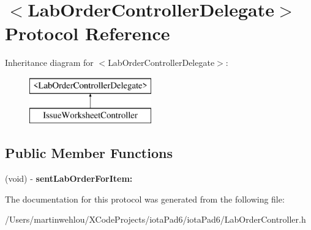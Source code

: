 \hypertarget{protocol_lab_order_controller_delegate-p}{
\section{$<$LabOrderControllerDelegate$>$ Protocol Reference}
\label{protocol_lab_order_controller_delegate-p}
}
Inheritance diagram for $<$LabOrderControllerDelegate$>$:\begin{figure}[H]
\begin{center}
\leavevmode
\includegraphics[height=2.000000cm]{protocol_lab_order_controller_delegate-p}
\end{center}
\end{figure}
\subsection*{Public Member Functions}
\begin{DoxyCompactItemize}
\item 
\hypertarget{protocol_lab_order_controller_delegate-p_ab8957ae93cbd3cf1f94b18056e327708}{
(void) -\/ {\bfseries sentLabOrderForItem:}}
\label{protocol_lab_order_controller_delegate-p_ab8957ae93cbd3cf1f94b18056e327708}

\end{DoxyCompactItemize}


The documentation for this protocol was generated from the following file:\begin{DoxyCompactItemize}
\item 
/Users/martinwehlou/XCodeProjects/iotaPad6/iotaPad6/LabOrderController.h\end{DoxyCompactItemize}
